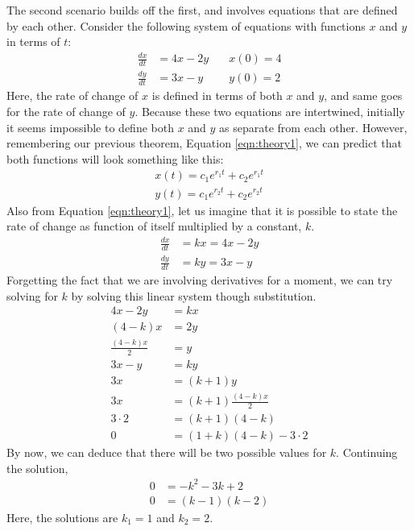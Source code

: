 The second scenario builds off the first, and involves equations that are defined by each other.
Consider the following system of equations with functions $x$ and $y$ in terms of $t$:
\begin{align*}
	\frac{dx}{dt} &= 4x - 2y \quad &x(0) = 4 \\
	\frac{dy}{dt} &= 3x - y \quad &y(0) = 2
\end{align*}
Here, the rate of change of $x$ is defined in terms of both $x$ and $y$, and same goes for the rate of change of $y$.
Because these two equations are intertwined, initially it seems impossible to define both $x$ and $y$ as separate from each other.
However, remembering our previous theorem, Equation \eqref{eqn:theory1}, we can predict that both functions will look something like this:
\begin{align}
	x(t) = c_1e^{r_1t} + c_2e^{r_1t} \label{eqn:x-t-general}\\
	y(t) = c_1e^{r_2t} + c_2e^{r_2t} \label{eqn:y-t-general}
\end{align}
Also from Equation \eqref{eqn:theory1}, let us imagine that it is possible to state the rate of change as function of itself multiplied by a constant, $k$.
\begin{align}
	\frac{dx}{dt} &= kx = 4x - 2y \label{eqn:kx-sys}\\
	\frac{dy}{dt} &= ky = 3x - y \label{eqn:ky-sys}
\end{align}
Forgetting the fact that we are involving derivatives for a moment, we can try solving for $k$ by solving this linear system though substitution.
\begin{align}
	4x - 2y &= kx \nonumber \\
	(4 - k)x &= 2y \nonumber \\
	\frac{(4 - k)x}{2} &= y \nonumber \\
	3x - y &=ky \nonumber \\
	3x &= (k + 1)y \nonumber \\
	3x &= (k + 1)\frac{(4 - k)x}{2} \nonumber \\
	3\cdot2 &= (k + 1)(4 - k) \nonumber \\
	0 &= (1 + k)(4 - k) - 3\cdot2 \label{eqn:chr-polynomial-ex}
\end{align}
By now, we can deduce that there will be two possible values for $k$.
Continuing the solution,
\begin{align*}
	0 &= -k^2 - 3k + 2 \\
	0 &= (k - 1)(k - 2)
\end{align*}
Here, the solutions are $k_1 = 1$ and $k_2 = 2$.
